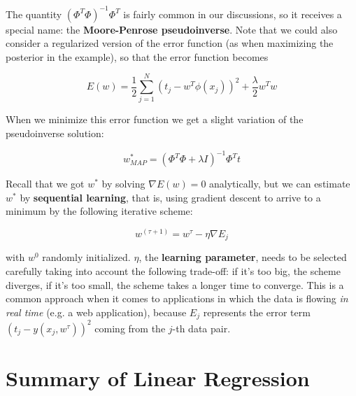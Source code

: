 \documentclass{report}
\begin{document}
The quantity $(\Phi^T\Phi)^{-1}\Phi^T$ is fairly common in our discussions, so it receives a special name: the \textbf{Moore-Penrose pseudoinverse}. Note that we could also consider a regularized version of the error function (as when maximizing the posterior in the example), so that the error function becomes

\[E(w) = \frac{1}{2}\sum_{j=1}^N(t_j - w^T\phi(x_j))^2 + \frac{\lambda}{2}w^Tw\]

When we minimize this error function we get a slight variation of the pseudoinverse solution:

\[w^*_{MAP} = (\Phi^T\Phi + \lambda I)^{-1}\Phi^Tt\]

Recall that we got $w^*$ by solving $\nabla E(w) = 0$ analytically, but we can estimate $w^*$ by \textbf{sequential learning}, that is, using gradient descent to arrive to a minimum by the following iterative scheme:

\[w^{(\tau+1)} = w^\tau - \eta\nabla E_j\]

with $w^0$ randomly initialized. $\eta$, the \textbf{learning parameter}, needs to be selected carefully taking into account the following trade-off: if it's too big, the scheme diverges, if it's too small, the scheme takes a longer time to converge. This is a common approach when it comes to applications in which the data is flowing \textit{in real time} (e.g. a web application), because $E_j$ represents the error term $(t_j - y(x_j, w^{\tau}))^2$ coming from the $j$-th data pair.

\section{Summary of Linear Regression}
\end{document}
